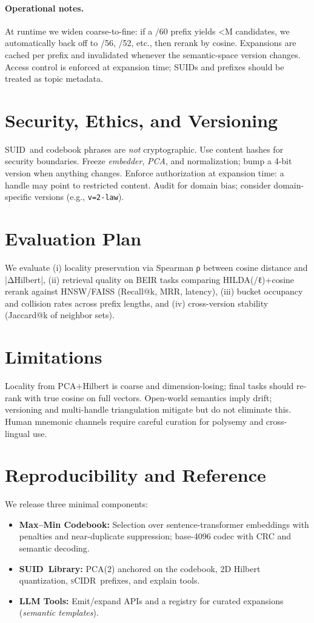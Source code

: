 \documentclass[11pt]{article}
\newcommand{\suid}{\textsc{SUID}}
\newcommand{\scidr}{\textsc{sCIDR}}
\begin{document}
\paragraph{Operational notes.}
At runtime we widen coarse-to-fine: if a /60 prefix yields <M candidates, we automatically back off to /56, /52, etc.,
then rerank by cosine. Expansions are cached per prefix and invalidated whenever the semantic-space version changes.
Access control is enforced at expansion time; SUIDs and prefixes should be treated as topic metadata.

\section{Security, Ethics, and Versioning}
\suid\ and codebook phrases are \emph{not} cryptographic. Use content hashes for security boundaries. Freeze \emph{embedder}, \emph{PCA}, and normalization; bump a 4-bit version when anything changes. Enforce authorization at expansion time: a handle may point to restricted content. Audit for domain bias; consider domain-specific versions (e.g., \texttt{v=2-law}).

\section{Evaluation Plan}
We evaluate (i) locality preservation via Spearman ρ between cosine distance and |ΔHilbert|,
(ii) retrieval quality on BEIR tasks comparing HILDA(/ℓ)+cosine rerank against HNSW/FAISS (Recall@k, MRR, latency),
(iii) bucket occupancy and collision rates across prefix lengths, and (iv) cross-version stability (Jaccard@k of neighbor sets).

\section{Limitations}
Locality from PCA$+$Hilbert is coarse and dimension-losing; final tasks should re-rank with true cosine on full vectors. Open-world semantics imply drift; versioning and multi-handle triangulation mitigate but do not eliminate this. Human mnemonic channels require careful curation for polysemy and cross-lingual use.

\section{Reproducibility and Reference}
We release three minimal components:
\begin{itemize}[leftmargin=2em]
  \item \textbf{Max--Min Codebook:} Selection over sentence-transformer embeddings with penalties and near-duplicate suppression; base-4096 codec with CRC and semantic decoding.
  \item \textbf{\suid\ Library:} PCA(2) anchored on the codebook, 2D Hilbert quantization, \scidr\ prefixes, and explain tools.
  \item \textbf{LLM Tools:} Emit/expand APIs and a registry for curated expansions (\emph{semantic templates}).
\end{itemize}
\end{document}
